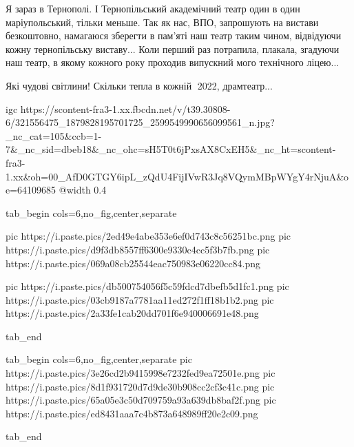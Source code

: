  
 
 
 
 


Я зараз в Тернополі. І Тернопільський академічний театр один в один
маріупольський, тільки меньше. Так як нас, ВПО, запрошують на вистави
безкоштовно, намагаюся зберегти в пам'яті наш театр таким чином, відвідуючи
кожну тернопільську виставу... Коли перший раз потрапила, плакала, згадуючи наш
театр, в якому кожного року проходив випускний мого технічного ліцею...


Які чудові світлини! Скільки тепла в кожній💖 2022, драмтеатр...

\ifcmt
  igc https://scontent-fra3-1.xx.fbcdn.net/v/t39.30808-6/321556475_1879828195701725_2599549990656099561_n.jpg?_nc_cat=105&ccb=1-7&_nc_sid=dbeb18&_nc_ohc=sH5T0t6jPxsAX8CxEH5&_nc_ht=scontent-fra3-1.xx&oh=00_AfD0GTGY6ipL_zQdU4FijIVwR3Jq8VQymMBpWYgY4rNjuA&oe=64109685
  @width 0.4
\fi

\begin{center}
\begin{minipage}{\textwidth}

\ifcmt
  tab_begin cols=6,no_fig,center,separate

     pic https://i.paste.pics/2ed49e4abe353e6ef0d743c8c56251bc.png
     pic https://i.paste.pics/d9f3db8557ff6300e9330c4cc5f3b7fb.png
     pic https://i.paste.pics/069a08cb25544eac750983e06220cc84.png

     pic https://i.paste.pics/db500754056f5c59fdcd7dbefb5d1fc1.png
     pic https://i.paste.pics/03cb9187a7781aa11ed272f1ff18b1b2.png
     pic https://i.paste.pics/2a33fe1cab20dd701f6e940006691e48.png

  tab_end
\fi

\end{minipage}
\end{center}

\begin{center}
\begin{minipage}{\textwidth}

\ifcmt
  tab_begin cols=6,no_fig,center,separate
    pic https://i.paste.pics/3e26cd2b9415998e7232fed9ea72501e.png
    pic https://i.paste.pics/8d1f931720d7d9de30b908cc2cf3c41c.png
    pic https://i.paste.pics/65a05e3c50d709759a93a639db8baf2f.png
    pic https://i.paste.pics/ed8431aaa7c4b873a648989ff20e2c09.png

  tab_end
\fi

\end{minipage}
\end{center}
